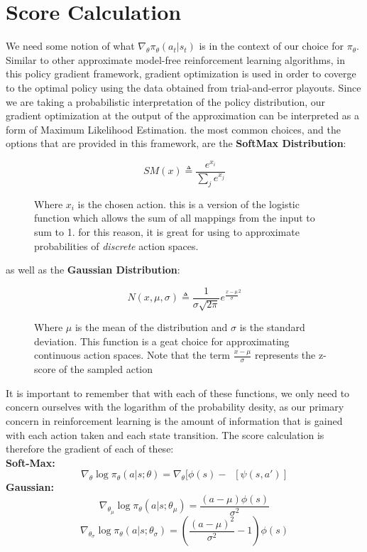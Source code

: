 \documentclass[11pt]{report}
\newcommand{\capteq}[2]{
	\begin{figure}[h!]
		\[
			#1
		\]
		\caption{#2}
	\end{figure}
}
\begin{document}
\section*{Score Calculation}
	\par We need some notion of what $\nabla_\theta \pi_\theta(a_t|s_t)$ is in the context of our choice for $\pi_\theta$. Similar to other approximate model-free reinforcement learning algorithms, in this policy gradient framework, gradient optimization is used in order to coverge to the optimal policy using the data obtained from trial-and-error playouts. Since we are taking a probabilistic interpretation of the policy distribution, our gradient optimization at the output of the approximation can be interpreted as a form of Maximum Likelihood Estimation. the most common choices, and the options that are provided in this framework, are the \textbf{SoftMax Distribution}:
	\capteq{
		SM(x) \triangleq \frac{e^{x_i}}{\sum_{j}e^{x_j}}
	}{
		Where $x_i$ is the chosen action. this is a version of the logistic function which allows the sum of all mappings from the input to sum to 1. for this reason, it is great for using to approximate probabilities of \emph{discrete} action spaces.
	}
	as well as the \textbf{Gaussian Distribution}:
	\capteq{
		N(x, \mu, \sigma) \triangleq \frac{1}{\sigma\sqrt{2\pi}}e^{\frac{x-\mu}{\sigma}^2}
	}{
		Where $\mu$ is the mean of the distribution and $\sigma$ is the standard deviation. This function is a geat choice for approximating continuous action spaces. Note that the term $\frac{x-\mu}{\sigma}$ represents the z-score of the sampled action
	}
	It is important to remember that with each of these functions, we only need to concern ourselves with the logarithm of the probability desity, as our primary concern in reinforcement learning is the amount of information that is gained with each action taken and each state transition. The score calculation is therefore the gradient of each of these:\\
	\textbf{Soft-Max: }
	\[ \nabla_\theta\log\pi_\theta(a|s;\theta) = \nabla_\theta[\phi(s) - \mathop{\mathbb{E}_{a'~\pi_\theta(a'|s)}}[\psi(s, a')]\]
	\textbf{Gaussian: }\[ \nabla_{\theta_\mu}\log\pi_\theta(a|s;\theta_\mu) = \frac{(a - \mu)\phi(s)}{\sigma^2}\]
	\[\nabla_{\theta_\sigma}\log\pi_\theta(a|s;\theta_\sigma) = (\frac{(a-\mu)^2}{\sigma^2} - 1)\phi(s)\]
\end{document}
